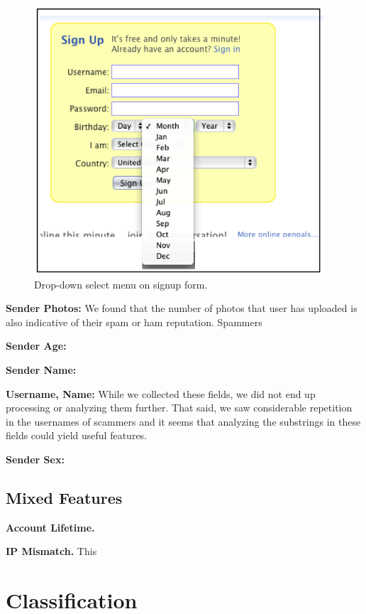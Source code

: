 \documentclass[preprint]{acm_proc_article-sp}
\begin{document}
\begin{figure}[h]
    \centering
    \includegraphics[width=\linewidth]{figures/dropdown.png}
    \caption{Drop-down select menu on signup form.}
    \label{fig:drop}
\end{figure}



\textbf{Sender Photos:} We found that the number of photos that user has uploaded is also indicative of their spam or ham reputation. Spammers 

\textbf{Sender Age:}

\textbf{Sender Name:}


\textbf{Username, Name:} While we collected these fields, we did not end up processing or analyzing them further. That said, we saw considerable repetition in the usernames of scammers and it seems that analyzing the substrings in these fields could yield useful features.

\textbf{Sender Sex:}

\subsection{Mixed Features}

\textbf{Account Lifetime.}

\textbf{IP Mismatch.} This 


\section{Classification}
\end{document}
